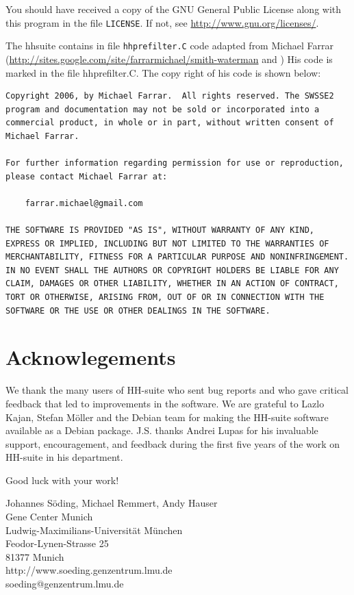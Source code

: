 \documentclass[11pt,a4paper]{article}
\begin{document}
You should have received a copy of the GNU General Public License
along with this program in the file \verb`LICENSE`.  
If not, see \url{http://www.gnu.org/licenses/}.

The hhsuite contains in file \verb`hhprefilter.C` code adapted from Michael 
Farrar (\url{http://sites.google.com/site/farrarmichael/smith-waterman}
and \cite{Farrar:2007}) His code is marked in the file hhprefilter.C. 
The copy right of his code is shown below:

\begin{verbatim}
Copyright 2006, by Michael Farrar.  All rights reserved. The SWSSE2
program and documentation may not be sold or incorporated into a
commercial product, in whole or in part, without written consent of
Michael Farrar.

For further information regarding permission for use or reproduction, 
please contact Michael Farrar at:

    farrar.michael@gmail.com

THE SOFTWARE IS PROVIDED "AS IS", WITHOUT WARRANTY OF ANY KIND, 
EXPRESS OR IMPLIED, INCLUDING BUT NOT LIMITED TO THE WARRANTIES OF 
MERCHANTABILITY, FITNESS FOR A PARTICULAR PURPOSE AND NONINFRINGEMENT. 
IN NO EVENT SHALL THE AUTHORS OR COPYRIGHT HOLDERS BE LIABLE FOR ANY 
CLAIM, DAMAGES OR OTHER LIABILITY, WHETHER IN AN ACTION OF CONTRACT, 
TORT OR OTHERWISE, ARISING FROM, OUT OF OR IN CONNECTION WITH THE 
SOFTWARE OR THE USE OR OTHER DEALINGS IN THE SOFTWARE.
\end{verbatim}

%


 
\section{Acknowlegements}

We thank the many users of HH-suite who sent bug reports and who gave critical feedback that led to improvements in the software. 
We are grateful to Lazlo Kajan, Stefan M\"oller and the Debian team for making the HH-suite software available as a Debian package. J.S. thanks Andrei Lupas for his invaluable support, encouragement, and feedback during the first five years of the work on HH-suite in his department.



\vspace{20mm}
\begin{center}
Good luck with your work!

\vspace{5mm}
Johannes S\"oding, Michael Remmert, Andy Hauser\\[2mm]
Gene Center Munich\\
Ludwig-Maximilians-Universit\"at M\"unchen\\
Feodor-Lynen-Strasse 25\\
81377 Munich\\
http://www.soeding.genzentrum.lmu.de\\
soeding@genzentrum.lmu.de
\end{center}
\end{document}

